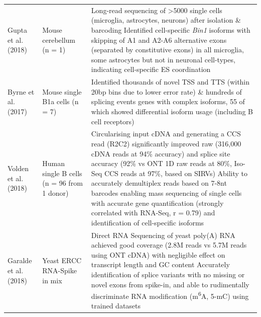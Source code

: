 \begin{changemargin}{1.5cm}
\begin{landscape}
\begin{longtable}[c]{p{4cm}p{4cm}p{18cm}}
			\centering Gupta et al.(2018) \cite{Gupta2018} &
			\centering Mouse cerebellum (n = 1)  &
			\tabitem Long-read sequencing of >5000 single cells (microglia, astrocytes, neurons) after isolation \& barcoding \newline 
			\tabitem Identified cell-specific \textit{Bin1} isoforms with skipping of A1 and A2-A6 alternative exons (separated by constitutive exons) in all microglia, some astrocytes but not in neuronal cell-types, indicating cell-specific ES coordination \\
			\hdashline[0.5pt/5pt]			
			
			\centering Byrne et al. (2017)\cite{Byrne2017} &
			\centering Mouse single B1a cells (n = 7) &
			\tabitem Identified thousands of novel TSS and TTS (within 20bp bins due to lower error rate) \& hundreds of splicing events \newline
			\tabitem 160 genes with complex isoforms, 55 of which showed differential isoform usage (including B cell receptors) \\
			\hdashline[0.5pt/5pt]
			
			\centering Volden et al. (2018) \cite{Volden2018} &
			\centering Human single B cells (n = 96 from 1 donor) &
			\tabitem Circularising input cDNA and generating a CCS read (R2C2) significantly improved raw (316,000 cDNA reads at 94\% accuracy) and splice site accuracy (92\% vs ONT 1D raw reads at 80\%, Iso-Seq CCS reads at 97\%, based on SIRVs) \newline 
			\tabitem Ability to accurately demultiplex reads based on 7-8nt barcodes enabling mass sequencing of single cells with accurate gene quantification (strongly correlated with RNA-Seq, r = 0.79) and identification of cell-specific isoforms \\
			\hdashline[0.5pt/5pt]
			
			
			\centering Garalde et al. (2018) \cite{Garalde2018} &
			\centering Yeast \newline ERCC RNA-Spike in mix &
			\tabitem Direct RNA Sequencing of yeast poly(A) RNA achieved good coverage (2.8M reads vs 5.7M reads using ONT cDNA) with negligible effect on transcript length and GC content \newline 
			\tabitem Accurately identification of splice variants with no missing or novel exons from spike-in, and able to rudimentally discriminate RNA modification (m\textsuperscript{6}A, 5-mC) using trained datasets  \\
			

\end{longtable}
\end{landscape}
\end{changemargin}
